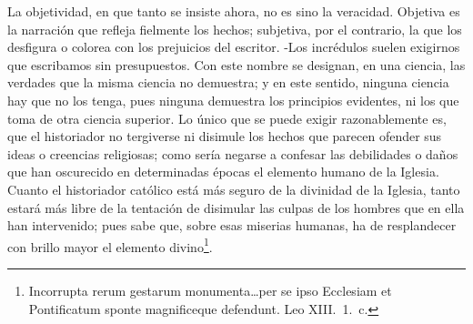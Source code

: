 \raggedbottom{} \documentclass[12pt, a4paper, openany]{book} %
\begin{document}
La objetividad, en que tanto se insiste ahora, no es sino la veracidad. Objetiva es la narración que refleja fielmente los hechos; subjetiva, por el contrario, la que los desfigura o colorea con los prejuicios del escritor. -Los incrédulos suelen exigirnos que escribamos sin presupuestos. Con este nombre se designan, en una ciencia, las verdades que la misma ciencia no demuestra; y en este sentido, ninguna ciencia hay que no los tenga, pues ninguna demuestra los principios evidentes, ni los que toma de otra ciencia superior. Lo único que se puede exigir razonablemente es, que el historiador no tergiverse ni disimule los hechos que parecen ofender sus ideas o creencias religiosas; como sería negarse a confesar las debilidades o daños que han oscurecido en determinadas épocas el elemento humano de la Iglesia. Cuanto el historiador católico está más seguro de la divinidad de la Iglesia, tanto estará más libre de la tentación de disimular las culpas de los hombres que en ella han intervenido; pues sabe que, sobre esas miserias humanas, ha de resplandecer con brillo mayor el elemento divino\footnote{Incorrupta rerum gestarum monumenta\ldots per se ipso Ecclesiam et Pontificatum sponte magnificeque defendunt. Leo XIII.\ 1.\ c.}.
\end{document}
